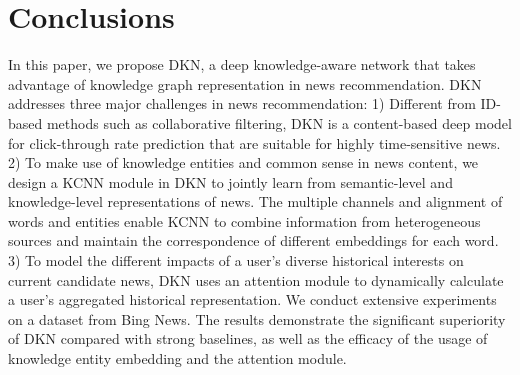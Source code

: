 \documentclass[sigconf]{acmart}
\begin{document}
\section{Conclusions}
	In this paper, we propose DKN, a deep knowledge-aware network that takes advantage of knowledge graph representation in news recommendation.
	DKN addresses three major challenges in news recommendation:
	1) Different from ID-based methods such as collaborative filtering, DKN is a content-based deep model for click-through rate prediction that are suitable for highly time-sensitive news.
	2) To make use of knowledge entities and common sense in news content, we design a KCNN module in DKN to jointly learn from semantic-level and knowledge-level representations of news.
	The multiple channels and alignment of words and entities enable KCNN to combine information from heterogeneous sources and maintain the correspondence of different embeddings for each word.
	3) To model the different impacts of a user's diverse historical interests on current candidate news, DKN uses an attention module to dynamically calculate a user's aggregated historical representation.
	We conduct extensive experiments on a dataset from Bing News.
	The results demonstrate the significant superiority of DKN compared with strong baselines, as well as the efficacy of the usage of knowledge entity embedding and the attention module.





 
\end{document}
